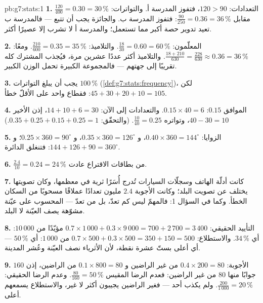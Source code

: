 \begin{solution}{pb:g7:stats:1}
\textbf{1.} التعدادات: $120 > 90$، فتفوز المدرسة أ. والتواترات:
$\frac{120}{400} = 0.30 = 30\,\%$ مقابل
$\frac{90}{250} = 0.36 = 36\,\%$: فتفوز المدرسة ب. والجائزة
يجب أن تتبع  --- فالمدرسة ب تعيد تدوير حصة أكبر
مما تستعمل؛ والمدرسة أ لا تشرب إلا عصيرًا أكثر.

\textbf{2.} المعلّمون: $\frac{18}{30} = 0.60 = 60\,\%$. والتلاميذ:
$\frac{210}{600} = 0.35 = 35\,\%$. ومعًا:
$\frac{18 + 210}{630} = \frac{228}{630} \approx 0.36 =
36\,\%$. والتلاميذ أكثر عددًا عشرين مرة، فيُجذب
 المشترك كله تقريبًا إلى جهتهم ---
فالمجموعة الكبيرة تحمل الوزن الكبير.

\textbf{3.} يجب أن يبلغ  التواترات $100\,\%$
(\cref{def:g7:stats:frequency})، لكن
$45 + 30 + 20 + 10 = 105$: فقطاع واحد على الأقلّ خطأ.

\textbf{4.}  الموافق  $0.15$:
$0.15 \times 40 = 6$. والتعدادات إلى الآن: $14 + 10 + 6 = 30$، إذن
 الأخير $40 - 30 = 10$، وتواتره
$\frac{10}{40} = 0.25$. (والتحقّق: $0.35 + 0.25 + 0.15 + 0.25 =
1$.)

\textbf{5.} الزوايا: $0.40 \times 360 = 144^\circ$،
و $0.35 \times 360 = 126^\circ$، و $0.25 \times 360 = 90^\circ$؛
و $144 + 126 + 90 = 360^\circ$: فتنغلق الدائرة.

\textbf{6.} $\frac{2.4}{10} = 0.24 = 24\,\%$ من بطاقات الاقتراع
عادت.

\textbf{7.} كانت أدلّة الهاتف وسجلّات السيارات تُدرج
أُسَرًا ثرية في معظمها، وكان تصويتها يختلف عن تصويت
البلد؛ وكانت الأجوبة $2.4$ مليون تعدادًا عملاقًا مسحوبًا
من السكان الخطأ. وكما في السؤال 1: فالمهمّ ليس
كم تعدّ، بل من تعدّ ---  المحسوب على عيّنة
مشوّهة يصف العيّنة لا البلد.

\textbf{8.} التأييد الحقيقي:
$0.7 \times 1\,000 + 0.3 \times 9\,000 = 700 + 2\,700 = 3\,400$
مؤيّدًا من $10\,000$: أي $34\,\%$. والاستطلاع:
$0.7 \times 500 + 0.3 \times 500 = 350 + 150 = 500$ من
$1\,000$: أي $50\,\%$ --- أي أعلى بستّ عشرة نقطة، لأن
الأثرياء نصف العيّنة وعُشر المدينة.

\textbf{9.} الأجوبة: $0.4 \times 200 = 80$ من غير الراضين و
$0.1 \times 800 = 80$ من الراضين، إذن $160$ جوابًا منها $80$
من غير الراضين: فعدم الرضا المقيس $\frac{80}{160} = 50\,\%$. وعدم
الرضا الحقيقي: $\frac{200}{1\,000} = 20\,\%$. ولم يكذب أحد ---
فغير الراضين يجيبون أكثر لا غير، والاستطلاع يسمعهم
أعلى.


\end{solution}

